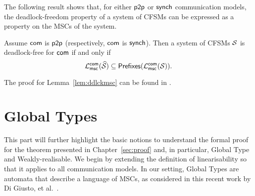 The following result shows that, for either $\mathsf{p2p}$ or 
$\mathsf{synch}$ communication models, the deadlock-freedom property 
of a system of CFSMs can be expressed as a property on the MSCs
of the system. 

\bigskip

\begin{lemma}\label{lem:ddlckmsc}
	\label{prop:deadlock-free-as-a-property-on-mscs-for-p2p-and-synch}
	Assume $\mathsf{com}$ is $\mathsf{p2p}$ (respectively, $\mathsf{com}$ is $\mathsf{synch}$).
	Then a system of CFSMs $\mathcal{S}$ is deadlock-free for $\mathsf{com}$ if and only if
	$$
	\mathcal{L}_{\mathsf{msc}}^{\mathsf{com}}(\widehat{\mathcal{S}})
	\subseteq
	\mathsf{Prefixes}(\mathcal{L}_{\mathsf{msc}}^{\mathsf{com}}(\mathcal{S})).
	$$
\end{lemma}

The proof for Lemma~\ref{lem:ddlckmsc} can be found in \cite[Proposition 2.1]{di2025realisability}.



\section{Global Types}
This part will further highlight the basic notions to understand the formal proof 
for the theorem presented in Chapter~\ref{sec:proof} and, in particular, Global Type
and Weakly-realisable. We begin by extending the definition of linearisability so 
that it applies to all communication models.
In our setting, Global Types are automata that describe a language of MSCs, 
as considered in this recent work by Di Giusto, et al.~\cite{di2025realisability}.



